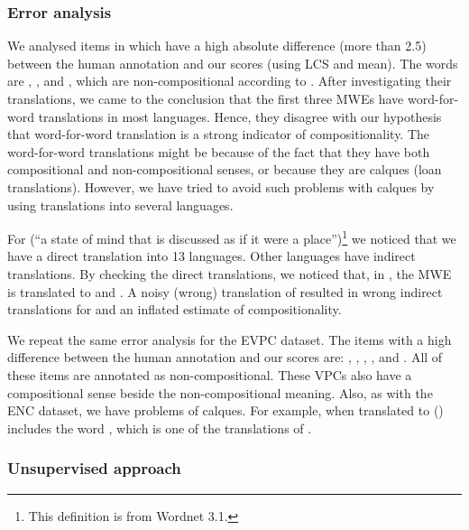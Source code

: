 \documentclass[output=paper
,modfonts
,nonflat]{langsci/langscibook}
\begin{document}
\subsubsection{Error analysis}
\label{sec:ss:erroranalysis}

We analysed items in \REDDY which have a high absolute difference (more than
2.5) between the human annotation and our scores (using LCS and
mean). The words are , ,
 and , which are
non-compositional according to \REDDY. After investigating their
translations, we came to the conclusion that the first three MWEs have
word-for-word translations in most languages. Hence, they disagree
with our hypothesis that word-for-word translation is a strong
indicator of compositionality.  The word-for-word translations might
be because of the fact that they have both compositional and
non-compositional senses, or because they are calques (loan
translations). However, we have tried to avoid such problems with
calques by using translations into several languages.

For  (``a state of mind that is discussed as if it
were a place'')\footnote{This definition is from Wordnet 3.1.} we
noticed that we have a direct translation into 13 languages. Other
languages have indirect translations. By checking the direct
translations, we noticed that, in , the MWE is translated to
 and . A noisy (wrong) translation of
  resulted in wrong indirect translations for
 and an inflated estimate of compositionality.

We repeat the same error analysis for the EVPC dataset. The items with
a high difference between the human annotation and our scores are:
, , ,
,  and . All
of these items are annotated as non-compositional. These VPCs also
have a compositional sense beside the non-compositional meaning. Also,
as with the ENC dataset, we have problems of calques. For example, 
 when translated to  ()
includes the word , which is one of the translations of
.

\subsubsection{Unsupervised approach}
\label{sec:ch4-1:unsupervised}
\end{document}
